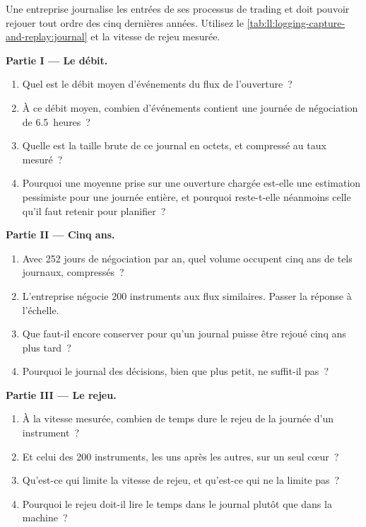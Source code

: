\begin{problem}\label{pb:ll:logging-capture-and-replay:1}
Une entreprise journalise les entrées de ses processus de trading et doit pouvoir rejouer tout ordre des cinq dernières années. Utilisez le
\cref{tab:ll:logging-capture-and-replay:journal} et la vitesse de rejeu mesurée.

\medskip\noindent\textbf{Partie I --- Le débit.}
\begin{enumerate}
\item Quel est le débit moyen d'événements du flux de l'ouverture~?
\item À ce débit moyen, combien d'événements contient une journée de négociation de 6.5~heures~?
\item Quelle est la taille brute de ce journal en octets, et compressé au taux mesuré~?
\item Pourquoi une moyenne prise sur une ouverture chargée est-elle une estimation pessimiste pour une journée entière, et pourquoi reste-t-elle néanmoins celle qu'il faut retenir
pour planifier~?
\end{enumerate}

\medskip\noindent\textbf{Partie II --- Cinq ans.}
\begin{enumerate}[resume]
\item Avec 252 jours de négociation par an, quel volume occupent cinq ans de tels journaux, compressés~?
\item L'entreprise négocie 200 instruments aux flux similaires. Passer la réponse à l'échelle.
\item Que faut-il encore conserver pour qu'un journal puisse être rejoué cinq ans plus tard~?
\item Pourquoi le journal des décisions, bien que plus petit, ne suffit-il pas~?
\end{enumerate}

\medskip\noindent\textbf{Partie III --- Le rejeu.}
\begin{enumerate}[resume]
\item À la vitesse mesurée, combien de temps dure le rejeu de la journée d'un instrument~?
\item Et celui des 200 instruments, les uns après les autres, sur un seul cœur~?
\item Qu'est-ce qui limite la vitesse de rejeu, et qu'est-ce qui ne la limite pas~?
\item Pourquoi le rejeu doit-il lire le temps dans le journal plutôt que dans la machine~?
\end{enumerate}


\end{problem}
